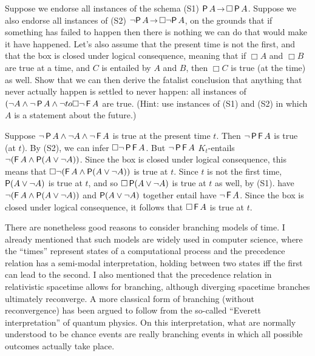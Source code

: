 \begin{exercise}
  Suppose we endorse all instances of the schema (S1) $\tP A \to \Box \tP A$.
  Suppose we also endorse all instances of (S2)
  $\neg \!\tP A \to \Box \neg \!\tP A$, on the grounds that if something has
  failed to happen then there is nothing we can do that would make it have
  happened. Let's also assume that the present time is not the first, and that
  the box is closed under logical consequence, meaning that if $\Box A$ and
  $\Box B$ are true at a time, and $C$ is entailed by $A$ and $B$, then $\Box C$
  is true (at the time) as well. Show that we can then derive the fatalist
  conclusion that anything that never actually happen is settled to never 
  happen: all instances of $(\neg A \land \neg \operatorname{\mathsf{P}} A \land \neg \\to \Box \neg \operatorname{\mathsf{F}} A$ are true. (Hint:
  use instances of (S1) and (S2) in which $A$ is a statement about the future.)
\end{exercise}
\begin{solution}
  Suppose $\neg \operatorname{\mathsf{P}} A \land \neg A \land \neg \operatorname{\mathsf{F}} A$ is true at the present time
  $t$. Then $\neg \operatorname{\mathsf{P}}\operatorname{\mathsf{F}} A$ is true (at $t$). By (S2), we can infer
  $\Box \neg \operatorname{\mathsf{P}}\operatorname{\mathsf{F}} A$. But $\neg \operatorname{\mathsf{P}}\operatorname{\mathsf{F}} A$ $K_{t}$-entails
  $\neg(\operatorname{\mathsf{F}} A \land \operatorname{\mathsf{P}}(A \lor \neg A))$. Since the box is closed under logical
  consequence, this means that $\Box \neg(\operatorname{\mathsf{F}} A \land \operatorname{\mathsf{P}}(A \lor \neg A))$ is
  true at $t$. Since $t$ is not the first time, $\operatorname{\mathsf{P}}(A \lor \neg A)$ is true at
  $t$, and so $\Box \operatorname{\mathsf{P}}(A \lor \neg A)$ is true at $t$ as well, by (S1). have
  $\neg(\operatorname{\mathsf{F}} A \land \operatorname{\mathsf{P}}(A \lor \neg A))$ and $\operatorname{\mathsf{P}}(A \lor \neg A)$ together
  entail have $\neg \operatorname{\mathsf{F}} A$. Since the box is closed under logical consequence,
  it follows that $\Box \operatorname{\mathsf{F}} A$ is true at $t$.
\end{solution}


There are nonetheless good reasons to consider branching models of time. I already
mentioned that such models are widely used in computer science, where
the ``times'' represent states of a computational process and the precedence
relation has a semi-modal interpretation, holding between two states iff the
first can lead to the second.
I also mentioned that the precedence relation in relativistic spacetime allows
for branching, although diverging spacetime branches ultimately reconverge. A
more classical form of branching (without reconvergence) has been argued to
follow from the so-called ``Everett interpretation'' of quantum physics. On this
interpretation, what are normally understood to be chance events are really
branching events in which all possible outcomes actually take place.

